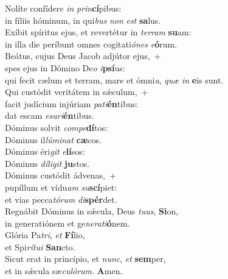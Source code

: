 \evenverse Nolíte confídere \textit{in} \textit{prin}\textbf{cí}pibus:~\*\\
\evenverse in fíliis hóminum, in qui\textit{bus} \textit{non} \textit{est} \textbf{sa}lus.\\
\oddverse Exíbit spíritus ejus, et revertétur in \textit{ter}\textit{ram} \textbf{su}am:~\*\\
\oddverse in illa die períbunt omnes cogitati\textit{ó}\textit{nes} \textit{e}\textbf{ó}rum.\\
\evenverse Beátus, cujus Deus Jacob adjútor ejus,~+\\
\evenverse  spes ejus in Dómino De\textit{o} \textit{i}\textbf{psí}us:~\*\\
\evenverse qui fecit cælum et terram, mare et ómni\textit{a}, \textit{quæ} \textit{in} \textbf{e}is sunt.\\
\oddverse Qui custódit veritátem in sǽculum,~+\\
\oddverse  facit judícium injúriam \textit{pa}\textit{ti}\textbf{én}tibus:~\*\\
\oddverse dat escam \textit{e}\textit{su}\textit{ri}\textbf{én}tibus.\\
\evenverse Dóminus solvit \textit{com}\textit{pe}\textbf{dí}tos:~\*\\
\evenverse Dóminus il\textit{lú}\textit{mi}\textit{nat} \textbf{cæ}cos.\\
\oddverse Dóminus éri\textit{git} \textit{e}\textbf{lí}sos:~\*\\
\oddverse Dóminus \textit{dí}\textit{li}\textit{git} \textbf{ju}stos.\\
\evenverse Dóminus custódit ádvenas,~+\\
\evenverse  pupíllum et vídu\textit{am} \textit{su}\textbf{scí}piet:~\*\\
\evenverse et vias pecca\textit{tó}\textit{rum} \textit{di}\textbf{spér}det.\\
\oddverse Regnábit Dóminus in sǽcula, Deus \textit{tu}\textit{us}, \textbf{Si}on,~\*\\
\oddverse in generatiónem et ge\textit{ne}\textit{ra}\textit{ti}\textbf{ó}nem.\\
\evenverse Glória Pa\textit{tri}, \textit{et} \textbf{Fí}lio,~\*\\
\evenverse et Spi\textit{rí}\textit{tu}\textit{i} \textbf{San}cto.\\
\oddverse Sicut erat in princípio, et \textit{nunc}, \textit{et} \textbf{sem}per,~\*\\
\oddverse et in sǽcula sæ\textit{cu}\textit{ló}\textit{rum}. \textbf{A}men.\\
